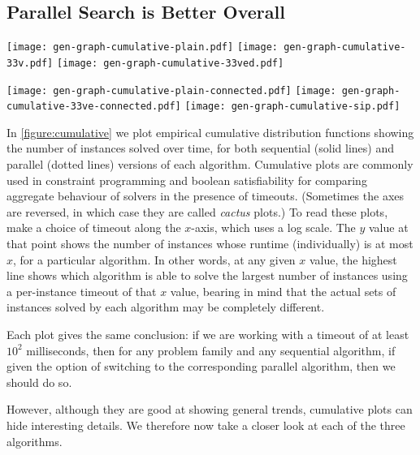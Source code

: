 \documentclass[sigconf]{acmart}
\begin{document}
\subsection{Parallel Search is Better Overall}

\begin{figure*}[p]
    \texttt{[image: gen-graph-cumulative-plain.pdf]}
    \hfill
    \texttt{[image: gen-graph-cumulative-33v.pdf]}
    \hfill
    \texttt{[image: gen-graph-cumulative-33ved.pdf]}

    \vspace*{1em}

    \texttt{[image: gen-graph-cumulative-plain-connected.pdf]}
    \hfill
    \texttt{[image: gen-graph-cumulative-33ve-connected.pdf]}
    \hfill
    \texttt{[image: gen-graph-cumulative-sip.pdf]}

    \caption{The cumulative number of instances solved over time, for different families and
    algorithms. The 32 threaded parallel versions (shown using dotted lines) are always better in
aggregate than the sequential versions (shown using solid lines).}\label{figure:cumulative}
\end{figure*}

In \cref{figure:cumulative} we plot empirical cumulative distribution functions showing the number
of instances solved over time, for both sequential (solid lines) and parallel (dotted lines)
versions of each algorithm.  Cumulative plots are commonly used in constraint programming and
boolean satisfiability for comparing aggregate behaviour of solvers in the presence of timeouts.
(Sometimes the axes are reversed, in which case they are called \emph{cactus} plots.)  To read these
plots, make a choice of timeout along the $x$-axis, which uses a log scale. The $y$ value at that
point shows the number of instances whose runtime (individually) is at most $x$, for a particular
algorithm. In other words, at any given $x$ value, the highest line shows which algorithm is able to
solve the largest number of instances using a per-instance timeout of that $x$ value, bearing in
mind that the actual sets of instances solved by each algorithm may be completely different.

Each plot gives the same conclusion: if we are working with a timeout of at least $10^2$
milliseconds, then for any problem family and any sequential algorithm, if given the option of
switching to the corresponding parallel algorithm, then we should do so.

However, although they are good at showing general trends, cumulative plots can hide interesting
details. We therefore now take a closer look at each of the three algorithms.
\end{document}
